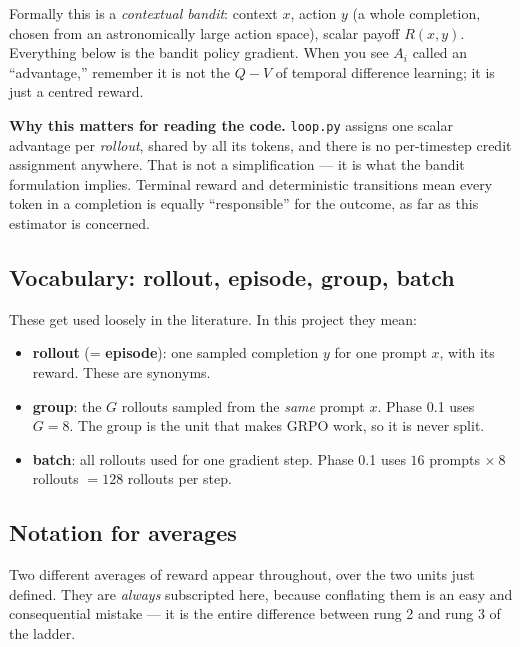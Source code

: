 \documentclass[11pt,letterpaper]{article}
\theoremstyle{definition}
\newcommand{\Adv}{A}
\begin{document}
Formally this is a \emph{contextual bandit}: context $x$, action $y$ (a whole completion, chosen from
an astronomically large action space), scalar payoff $R(x,y)$. Everything below is the bandit policy
gradient. When you see $\Adv_i$ called an ``advantage,'' remember it is not the $Q - V$ of temporal
difference learning; it is just a centred reward.

\begin{aside}
\textbf{Why this matters for reading the code.} \texttt{loop.py} assigns one scalar advantage per
\emph{rollout}, shared by all its tokens, and there is no per-timestep credit assignment anywhere.
That is not a simplification --- it is what the bandit formulation implies. Terminal reward and
deterministic transitions mean every token in a completion is equally ``responsible'' for the
outcome, as far as this estimator is concerned.
\end{aside}

\subsection{Vocabulary: rollout, episode, group, batch}

These get used loosely in the literature. In this project they mean:

\begin{itemize}
  \item \textbf{rollout} (= \textbf{episode}): one sampled completion $y$ for one prompt $x$, with
        its reward. These are synonyms.
  \item \textbf{group}: the $G$ rollouts sampled from the \emph{same} prompt $x$. Phase 0.1 uses
        $G = 8$. The group is the unit that makes GRPO work, so it is never split.
  \item \textbf{batch}: all rollouts used for one gradient step. Phase 0.1 uses $16$ prompts
        $\times\ 8$ rollouts $= 128$ rollouts per step.
\end{itemize}

\subsection{Notation for averages}
\label{sec:rbar}

Two different averages of reward appear throughout, over the two units just defined. They are
\emph{always} subscripted here, because conflating them is an easy and consequential mistake --- it
is the entire difference between rung 2 and rung 3 of the ladder.
\end{document}
